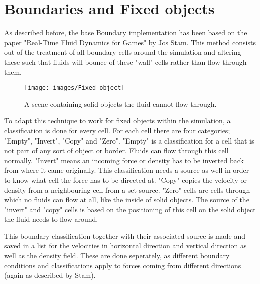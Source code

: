 \chapter{Boundaries and Fixed objects}
\label{chap:BoundariesAndFixedObjects}

As described before, the base Boundary implementation has been based on the paper "Real-Time Fluid Dynamics for Games" by Jos Stam. This method consists out of the treatment of all boundary cells around the simulation and altering these such that fluids will bounce of these "wall"-cells rather than flow through them.

\begin{figure}[htb!]
    \centering
    \texttt{[image: images/Fixed\_object]}
    \caption{A scene containing solid objects the fluid cannot flow through.}
    \label{fig:Fixed_object}
\end{figure}

To adapt this technique to work for fixed objects within the simulation, a classification is done for every cell. For each cell there are four categories; "Empty", "Invert", "Copy" and "Zero". "Empty" is a classification for a cell that is not part of any sort of object or border. Fluids can flow through this cell normally. "Invert" means an incoming force or density has to be inverted back from where it came originally. This classification needs a source as well in order to know what cell the force has to be directed at. "Copy" copies the velocity or density from a neighbouring cell from a set source. "Zero" cells are cells through which no fluids can flow at all, like the inside of solid objects. The source of the "invert" and "copy" cells is based on the positioning of this cell on the solid object the fluid needs to flow around.

This boundary classification together with their associated source is made and saved in a list for the velocities in horizontal direction and vertical direction as well as the density field. These are done seperately, as different boundary conditions and classifications apply to forces coming from different directions (again as described by Stam).
